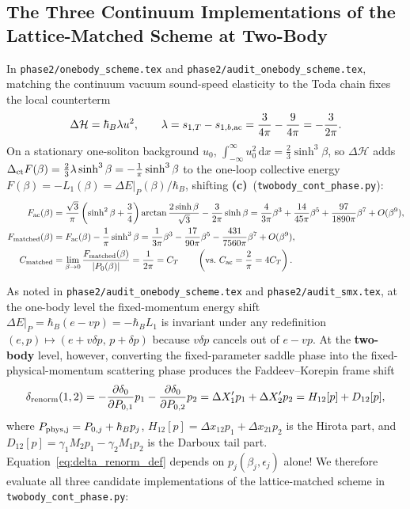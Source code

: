 \documentclass[11pt,a4paper]{article}
\newcommand{\Lc}{\textbf{(c)}}
\newcommand{\script}[1]{\texttt{#1}}
\newcommand{\dd}{\mathrm{d}}
\begin{document}
\subsection{The Three Continuum Implementations of the Lattice-Matched Scheme at Two-Body}

In \texttt{phase2/onebody\_scheme.tex} and \texttt{phase2/audit\_onebody\_scheme.tex}, matching the continuum vacuum sound-speed elasticity to the Toda chain fixes the local counterterm
\begin{equation}\label{eq:Delta_H}
\Delta\mathcal{H}=\hbar_B\lambda u^2,\qquad
\lambda=s_{1,T}-s_{1,b,\rm ac}=\frac{3}{4\pi}-\frac{9}{4\pi}=-\frac{3}{2\pi}.
\end{equation}
On a stationary one-soliton background $u_0$, $\int_{-\infty}^\infty u_0^2\,\dd x=\frac23\sinh^3\beta$, so $\Delta\mathcal{H}$ adds $\Delta_{\rm ct}F(\beta)=\frac23\lambda\sinh^3\beta=-\frac{1}{\pi}\sinh^3\beta$ to the one-loop collective energy $F(\beta)=-L_1(\beta)=\Delta E|_P(\beta)/\hbar_B$, shifting \Lc\ (\script{twobody\_cont\_phase.py}):
\begin{align}
F_{\rm ac}(\beta)&=\frac{\sqrt3}{\pi}\left(\sinh^2\beta+\frac34\right)\arctan\frac{2\sinh\beta}{\sqrt3}-\frac{3}{2\pi}\sinh\beta
=\frac{4}{3\pi}\beta^3+\frac{14}{45\pi}\beta^5+\frac{97}{1890\pi}\beta^7+O(\beta^9),\label{eq:F_ac}\\
F_{\rm matched}(\beta)&=F_{\rm ac}(\beta)-\frac{1}{\pi}\sinh^3\beta
=\frac{1}{3\pi}\beta^3-\frac{17}{90\pi}\beta^5-\frac{431}{7560\pi}\beta^7+O(\beta^9),\label{eq:F_matched}\\
C_{\rm matched}&=\lim_{\beta\to 0}\frac{F_{\rm matched}(\beta)}{|P_0(\beta)|}=\frac{1}{2\pi}=C_T\qquad\left(\text{vs.\ }C_{\rm ac}=\frac{2}{\pi}=4C_T\right).\label{eq:C_matched}
\end{align}

As noted in \texttt{phase2/audit\_onebody\_scheme.tex} and \texttt{phase2/audit\_smx.tex}, at the one-body level the fixed-momentum energy shift $\Delta E|_P=\hbar_B(e-vp)=-\hbar_B L_1$ is invariant under any redefinition $(e,p)\mapsto(e+v\delta p,\,p+\delta p)$ because $v\delta p$ cancels out of $e-vp$. At the \textbf{two-body} level, however, converting the fixed-parameter saddle phase into the fixed-physical-momentum scattering phase produces the Faddeev--Korepin frame shift
\begin{equation}\label{eq:delta_renorm_def}
\delta_{\rm renorm}(1,2)=-\frac{\partial\delta_0}{\partial P_{0,1}}p_1-\frac{\partial\delta_0}{\partial P_{0,2}}p_2
=\Delta X_1' p_1+\Delta X_2' p_2=H_{12}[p]+D_{12}[p],
\end{equation}
where $P_{\rm phys,j}=P_{0,j}+\hbar_B p_j$, $H_{12}[p]=\Delta x_{12}p_1+\Delta x_{21}p_2$ is the Hirota part, and $D_{12}[p]=\gamma_1 M_2 p_1-\gamma_2 M_1 p_2$ is the Darboux tail part. Equation~\eqref{eq:delta_renorm_def} depends on $p_j(\beta_j,\epsilon_j)$ alone! We therefore evaluate all three candidate implementations of the lattice-matched scheme in \script{twobody\_cont\_phase.py}:
\end{document}
